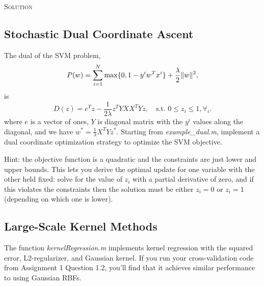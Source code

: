 \documentclass{article}
\begin{document}
\textsc{Solution}



\subsection{Stochastic Dual Coordinate Ascent}
The dual of the SVM problem,
\[
P(w) = \sum_{i=1}^N \max\{0,1-y^iw^Tx^i\} + \frac{\lambda}{2}\|w\|^2,
\]
is
\[
D(z) = e^Tz - \frac{1}{2\lambda}z^TYXX^TYz, \quad\text{s.t. } 0 \leq z_i \leq 1, \forall_i.
\]
where $e$ is a vector of ones, $Y$ is diagonal matrix with the $y^i$ values along the diagonal, and we have $w^* = \frac{1}{\lambda}X^TYz^*$. Starting from \emph{example\_dual.m}, implement a dual coordinate optimization  strategy to optimize the SVM objective. 

Hint: the objective function is a quadratic and the constraints are just lower and upper bounds. This lets you  derive the optimal update for one variable with the other held fixed: solve for the value of $z_i$ with a partial derivative of zero, and if this violates the constraints then the solution must be either $z_i = 0$ or $z_i = 1$ (depending on which one is lower).

\subsection{Large-Scale Kernel Methods}

The function \emph{kernelRegression.m} implements kernel regression with the squared error, L2-regularizer, and Gaussian kernel. If you run your cross-validation code from Assignment 1 Question 1.2, you'll find that it achieves similar performance to using Gaussian RBFs.
\end{document}
